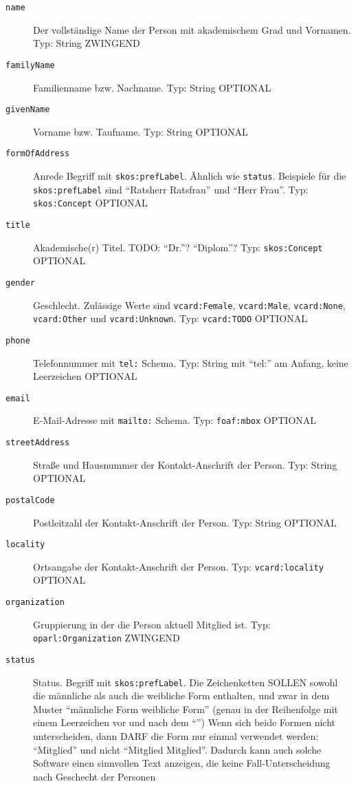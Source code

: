 \documentclass[,a4paper]{article}
\begin{document}
\begin{description}
\item[\texttt{name}]
Der vollständige Name der Person mit akademischem Grad und Vornamen.
Typ: String ZWINGEND
\item[\texttt{familyName}]
Familienname bzw. Nachname. Typ: String OPTIONAL
\item[\texttt{givenName}]
Vorname bzw. Taufname. Typ: String OPTIONAL
\item[\texttt{formOfAddress}]
Anrede Begriff mit \texttt{skos:prefLabel}. Ähnlich wie \texttt{status}.
Beispiele für die \texttt{skos:prefLabel} sind ``Ratsherr \textbar{}
Ratsfrau'' und ``Herr \textbar{} Frau''. Typ: \texttt{skos:Concept}
OPTIONAL
\item[\texttt{title}]
Akademische(r) Titel. TODO: ``Dr.''? ``Diplom''? Typ:
\texttt{skos:Concept} OPTIONAL
\item[\texttt{gender}]
Geschlecht. Zulässige Werte sind \texttt{vcard:Female},
\texttt{vcard:Male}, \texttt{vcard:None}, \texttt{vcard:Other} und
\texttt{vcard:Unknown}. Typ: \texttt{vcard:TODO} OPTIONAL
\item[\texttt{phone}]
Telefonnummer mit \texttt{tel:} Schema. Typ: String mit ``tel:'' am
Anfang, keine Leerzeichen OPTIONAL
\item[\texttt{email}]
E-Mail-Adresse mit \texttt{mailto:} Schema. Typ: \texttt{foaf:mbox}
OPTIONAL
\item[\texttt{streetAddress}]
Straße und Hausnummer der Kontakt-Anschrift der Person. Typ: String
OPTIONAL
\item[\texttt{postalCode}]
Postleitzahl der Kontakt-Anschrift der Person. Typ: String OPTIONAL
\item[\texttt{locality}]
Ortsangabe der Kontakt-Anschrift der Person. Typ:
\texttt{vcard:locality} OPTIONAL
\item[\texttt{organization}]
Gruppierung in der die Person aktuell Mitglied ist. Typ:
\texttt{oparl:Organization} ZWINGEND
\item[\texttt{status}]
Status. Begriff mit \texttt{skos:prefLabel}. Die Zeichenketten SOLLEN
sowohl die männliche als auch die weibliche Form enthalten, und zwar in
dem Muster ``männliche Form \textbar{} weibliche Form'' (genau in der
Reihenfolge mit einem Leerzeichen vor und nach dem ``\textbar{}'') Wenn
sich beide Formen nicht unterscheiden, dann DARF die Form nur einmal
verwendet werden: ``Mitglied'' und nicht ``Mitglied \textbar{}
Mitglied''. Dadurch kann auch solche Software einen sinnvollen Text
anzeigen, die keine Fall-Unterscheidung nach Geschecht der Personen

\end{description}
\end{document}
